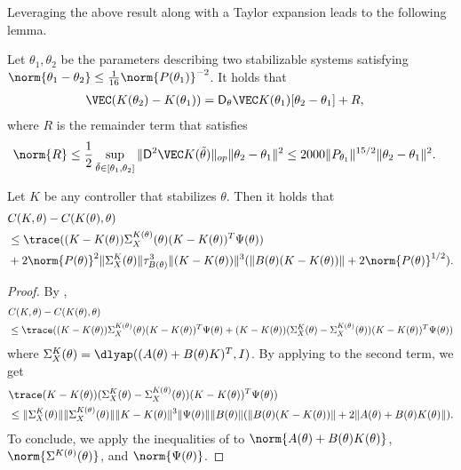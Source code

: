 Leveraging the above result along with a Taylor expansion leads to the following lemma. 
\begin{lemma} 
    \label{lem: LQR Taylor expansion}
    Let $\theta_1, \theta_2$ be the parameters describing two stabilizable systems satisfying $\norm{\theta_1-\theta_2}\leq \frac{1}{16} \norm{P(\theta_1)}^{-2}$. It holds that
    \begin{align*}
        \VEC (K(\theta_2) - K(\theta_1)) &= \mathsf{D}_{\theta}\VEC K(\theta_1)[\theta_2 - \theta_1] + R,
    \end{align*}
    where $R$ is the remainder term that satisfies
    \begin{align*}
        \norm{R} &\leq \frac{1}{2}\sup_{\tilde\theta\in[\theta_1, \theta_2]}\|\mathsf{D}^2\VEC K(\tilde\theta)\|_{op}\|\theta_2-\theta_1\|^2 \leq 2000\|P_{\theta_1}\|^{15/2}\|\theta_2-\theta_1\|^2.
    \end{align*}
\end{lemma}

\begin{lemma}
    \label{lem: excess cost decomposition}
    Let $K$ be any controller that stabilizes $\theta$. Then it holds that
    \begin{align*}
        &C(K,\theta) - C(K(\theta), \theta) \\
        &\leq \trace ((K-K(\theta))\Sigma_X^{K(\theta)}(\theta)(K-K(\theta))^T\Psi(\theta))\\
        &+ 2 \norm{P(\theta)}^2 \|\Sigma_X^{K}(\theta)\|\tau_{B(\theta)}^3\|(K-K(\theta))\|^3(\|B(\theta)(K-K(\theta))\| + 2 \norm{P(\theta)}^{1/2}).
    \end{align*}
\end{lemma}
\begin{proof}
    By , 
    \begin{align*}
        &C(K,\theta) - C(K(\theta), \theta) \\
        &\leq \trace ((K-K(\theta))\Sigma_X^{K(\theta)}(\theta)(K-K(\theta))^T\Psi(\theta) + (K-K(\theta))(\Sigma_X^K(\theta) - \Sigma_X^{K(\theta)}(\theta))(K-K(\theta))^T\Psi(\theta))
\end{align*}
where $\Sigma_X^K(\theta) = \dlyap((A(\theta)+B(\theta) K)^T, I)$. 
By applying  to the second term, we get
\begin{align*}
    &\trace(K-K(\theta))(\Sigma_X^K(\theta) - \Sigma_X^{K(\theta)}(\theta))(K-K(\theta))^T\Psi(\theta))\\
    &\leq \|\Sigma_X^K(\theta)\|\|\Sigma_X^{K(\theta)}(\theta)\|\|K-K(\theta)\|^3\|\Psi(\theta)\|\|B(\theta)\|(\|B(\theta)(K-K(\theta))\| + 2\|A(\theta)+B(\theta) K(\theta)\|).
\end{align*}
To conclude, we apply the inequalities of  to $\norm{A(\theta) + B(\theta) K(\theta)}$, $\norm{\Sigma^{K(\theta)}(\theta)}$, and $\norm{\Psi(\theta)}$. 
\end{proof}

